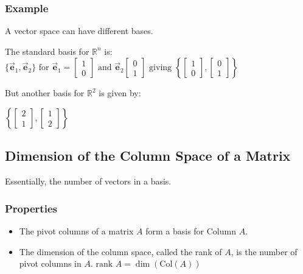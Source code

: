 \documentclass[12pt,landscape,twocolumn]{article}
\let\oldvec\vec
\renewcommand{\vec}[1]{\oldvec{\mathbf{ #1 } } }                    %
\begin{document}
        \subsubsection{Example}
        A vector space can have different bases.

        The standard basis for $\mathbb{R}^n$ is:
        $
        \{\vec{e}_1, \vec{e}_2\} \text{ for } \vec{e}_1 =
        \left[ \begin{array}{c}
        1\\
        0
        \end{array}\right] \text{ and } \vec{e}_2
        \left[ \begin{array}{c}
        0\\
        1
        \end{array}\right] \text{ giving }
        \left\{ \left[ \begin{array}{c}
        1\\
        0
        \end{array}\right],
        \left[ \begin{array}{c}
        0\\
        1
        \end{array}\right]\right\}
        $

        But another basis for $\mathbb{R}^2$ is given by:

        $
        \left\{ \left[ \begin{array}{c}
        2\\
        1
        \end{array}\right],
        \left[ \begin{array}{c}
        1\\
        2
        \end{array}\right]\right\}
        $
    \subsection{Dimension of the Column Space of a Matrix}
    Essentially, the number of vectors in a basis.

        \subsubsection{Properties}
        \begin{itemize}
            \item The pivot columns of a matrix $A$ form a basis for Column $A$.
            \item The dimension of the column space, called the rank of $A$, is the number of pivot columns in $A$.
                $
                    \text{rank } A = \dim(\text{Col}(A))
                $
        \end{itemize}
\end{document}
